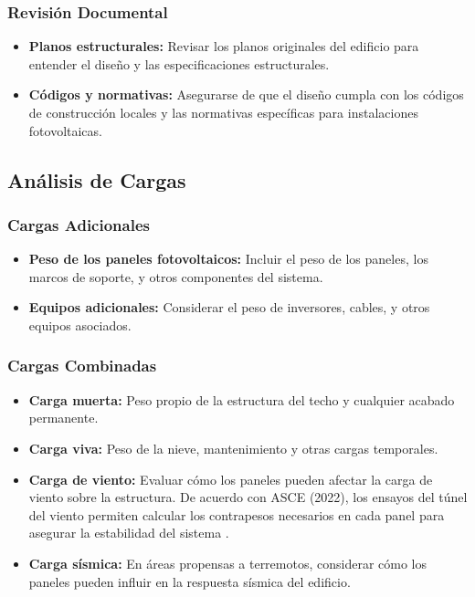\documentclass[a4paper,12pt]{article}
\begin{document}
\begin{Form}
\subsubsection*{Revisión Documental}
\begin{itemize}
    \item \textbf{Planos estructurales:} Revisar los planos originales del edificio para entender el diseño y las especificaciones estructurales.
    \item \textbf{Códigos y normativas:} Asegurarse de que el diseño cumpla con los códigos de construcción locales y las normativas específicas para instalaciones fotovoltaicas.
\end{itemize}

\subsection*{Análisis de Cargas}

\subsubsection*{Cargas Adicionales}
\begin{itemize}
    \item \textbf{Peso de los paneles fotovoltaicos:} Incluir el peso de los paneles, los marcos de soporte, y otros componentes del sistema.
    \item \textbf{Equipos adicionales:} Considerar el peso de inversores, cables, y otros equipos asociados.
\end{itemize}

\subsubsection*{Cargas Combinadas}
\begin{itemize}
    \item \textbf{Carga muerta:} Peso propio de la estructura del techo y cualquier acabado permanente.
    \item \textbf{Carga viva:} Peso de la nieve, mantenimiento y otras cargas temporales.
    \item \textbf{Carga de viento:} Evaluar cómo los paneles pueden afectar la carga de viento sobre la estructura. De acuerdo con ASCE (2022), los ensayos del túnel del viento permiten calcular los contrapesos necesarios en cada panel para asegurar la estabilidad del sistema \cite{idaepctcon}.
    \item \textbf{Carga sísmica:} En áreas propensas a terremotos, considerar cómo los paneles pueden influir en la respuesta sísmica del edificio.
\end{itemize}


\end{Form}
\end{document}
